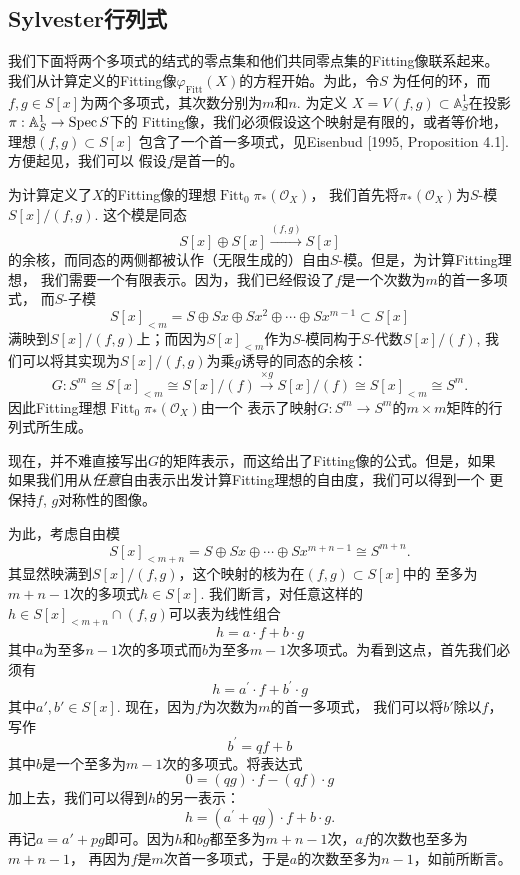 \subsection{Sylvester行列式}\label{s:5.2.2}

我们下面将两个多项式的结式的零点集和他们共同零点集的Fitting像联系起来。
我们从计算定义的Fitting像$\varphi_{\text{Fitt}}(X)$的方程开始。为此，令$S$
为任何的环，而$f,g\in S[x]$为两个多项式，其次数分别为$m$和$n$. 为定义
$X=V(f,g)\subset \mathbb A_S^1$在投影$\pi:\mathbb A_S^1\to \operatorname{Spec} S$下的
Fitting像，我们必须假设这个映射是有限的，或者等价地，理想$(f,g)\subset S[x]$
包含了一个首一多项式，见Eisenbud [1995, Proposition 4.1]. 方便起见，我们可以
假设$f$是首一的。

为计算定义了$X$的Fitting像的理想$\operatorname{Fitt}_0 \pi_*(\mathscr{O}_X)$，
我们首先将$\pi_*(\mathscr O_X)$为$S$-模$S[x]/(f,g)$. 这个模是同态
\[
    S[x] \oplus S[x] \stackrel{(f, g)}{\longrightarrow} S[x]
\]
的余核，而同态的两侧都被认作（无限生成的）自由$S$-模。但是，为计算Fitting理想，
我们需要一个有限表示。因为，我们已经假设了$f$是一个次数为$m$的首一多项式，
而$S$-子模
\[
    S[x]_{<m}=S \oplus S x \oplus S x^2 \oplus \cdots \oplus S x^{m-1} 
    \subset S[x]
\]
满映到$S[x]/(f,g)$上；而因为$S[x]_{<m}$作为$S$-模同构于$S$-代数$S[x]/(f)$,
我们可以将其实现为$S[x]/(f,g)$为乘$g$诱导的同态的余核：
\[
    G: S^m \cong S[x]_{<m} \cong S[x] /(f) \stackrel{\times g}{\longrightarrow} 
    S[x] /(f) \cong S[x]_{<m} \cong S^m.
\]
因此Fitting理想$\operatorname{Fitt}_0 \pi_*(\mathscr{O}_X)$由一个
表示了映射$G:S^m\to S^m$的$m\times m$矩阵的行列式所生成。

现在，并不难直接写出$G$的矩阵表示，而这给出了Fitting像的公式。但是，如果
如果我们用从\textit{任意}自由表示出发计算Fitting理想的自由度，我们可以得到一个
更保持$f$, $g$对称性的图像。

为此，考虑自由模
\[
    S[x]_{<m+n}=S \oplus S x \oplus \cdots \oplus S x^{m+n-1} \cong S^{m+n} .
\]
其显然映满到$S[x]/(f,g)$，这个映射的核为在$(f,g)\subset S[x]$中的
至多为$m+n-1$次的多项式$h\in S[x]$. 我们断言，对任意这样的
$h \in S[x]_{<m+n} \cap(f, g)$可以表为线性组合
\[
    h=a \cdot f+b \cdot g
\]
其中$a$为至多$n-1$次的多项式而$b$为至多$m-1$次多项式。为看到这点，首先我们必须有
\[
    h=a^{\prime} \cdot f+b^{\prime} \cdot g
\]
其中$a',b'\in S[x]$. 现在，因为$f$为次数为$m$的首一多项式，
我们可以将$b'$除以$f$，写作
\[
    b^{\prime}=q f+b
\]
其中$b$是一个至多为$m-1$次的多项式。将表达式
\[
    0=(q g) \cdot f-(q f) \cdot g
\]
加上去，我们可以得到$h$的另一表示：
\[
    h=\left(a^{\prime}+q g\right) \cdot f+b \cdot g.
\]
再记$a=a'+pg$即可。因为$h$和$bg$都至多为$m+n-1$次，$af$的次数也至多为$m+n-1$，
再因为$f$是$m$次首一多项式，于是$a$的次数至多为$n-1$，如前所断言。

